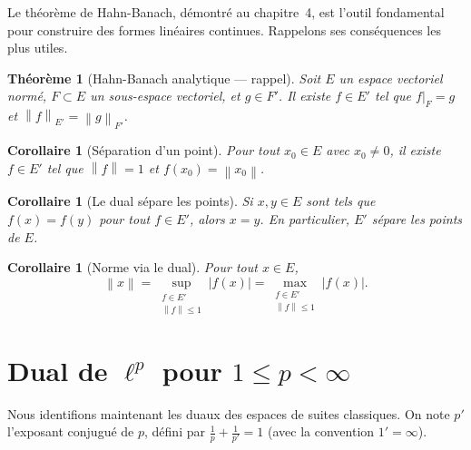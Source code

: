 \documentclass[a4paper,12pt]{book}
\newcommand{\norm}[1]{\left\| #1 \right\|}
\newcommand{\abs}[1]{\left| #1 \right|}
\theoremstyle{definition}
\theoremstyle{plain}
\newtheorem{theoreme}[definition]{Théorème}
\newtheorem{corollaire}[definition]{Corollaire}
\theoremstyle{remark}
\begin{document}
Le théorème de Hahn-Banach,
démontré au chapitre~4, est l'outil fondamental pour construire des formes
linéaires continues. Rappelons ses conséquences les plus utiles.

\begin{theoreme}[Hahn-Banach analytique --- rappel]
\label{thm:hahn-banach-rappel}
Soit $E$ un espace vectoriel normé, $F \subset E$ un sous-espace vectoriel,
et $g \in F'$. Il existe $f \in E'$ tel que $f|_F = g$ et $\norm{f}_{E'} = \norm{g}_{F'}$.
\end{theoreme}

\begin{corollaire}[Séparation d'un point]
\label{cor:separation-point}
Pour tout $x_0 \in E$ avec $x_0 \neq 0$, il existe $f \in E'$ tel que
$\norm{f} = 1$ et $f(x_0) = \norm{x_0}$.
\end{corollaire}

\begin{corollaire}[Le dual sépare les points]
\label{cor:dual-separe}
Si $x, y \in E$ sont tels que $f(x) = f(y)$ pour tout $f \in E'$, alors $x = y$.
En particulier, $E'$ sépare les points de $E$.
\end{corollaire}

\begin{corollaire}[Norme via le dual]
\label{cor:norme-via-dual}
Pour tout $x \in E$,
\[
  \norm{x} = \sup_{\substack{f \in E' \\ \norm{f} \le 1}} \abs{f(x)}
  = \max_{\substack{f \in E' \\ \norm{f} \le 1}} \abs{f(x)}.
\]
\end{corollaire}


\section{Dual de $\ell^p$ pour $1 \le p < \infty$}
\label{sec:dual-lp}


Nous identifions maintenant les duaux des espaces de suites classiques. On note
$p'$ l'exposant conjugué de $p$, défini par
$\frac{1}{p} + \frac{1}{p'} = 1$ (avec la convention $1' = \infty$).
\end{document}
